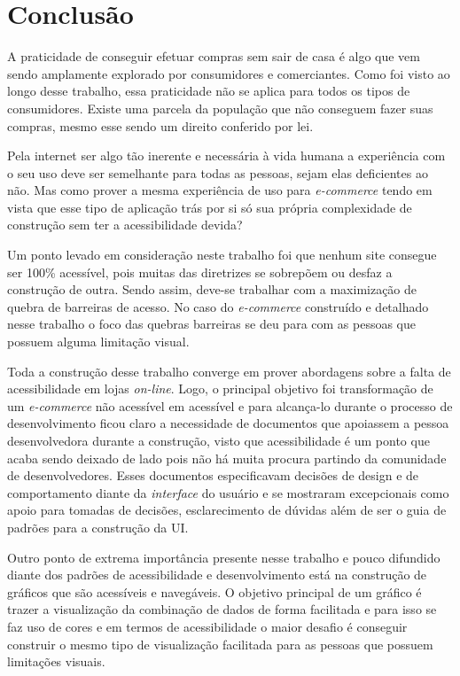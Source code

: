 \section{Conclusão}
\label{sec:conclusao}


{

A praticidade de conseguir efetuar compras sem sair de casa é algo que vem sendo amplamente explorado por consumidores e comerciantes. Como foi visto ao longo desse trabalho, essa praticidade não se aplica para todos os tipos de consumidores. Existe uma parcela da população que não conseguem fazer suas compras, mesmo esse sendo um direito conferido por lei.

Pela internet ser algo tão inerente e necessária à vida humana a experiência com o seu uso deve ser semelhante para todas as pessoas, sejam elas deficientes ao não. Mas como prover a mesma experiência de uso para \textit{e-commerce} tendo em vista que esse tipo de aplicação trás por si só sua própria complexidade de construção sem ter a acessibilidade devida? 

Um ponto levado em consideração neste trabalho foi que nenhum site consegue ser 100\% acessível, pois muitas das diretrizes se sobrepõem ou desfaz a construção de outra. Sendo assim, deve-se trabalhar com a maximização de quebra de barreiras de acesso. No caso do \textit{e-commerce} construído e detalhado nesse trabalho o foco das quebras barreiras se deu para com as pessoas que possuem alguma limitação visual. 

Toda a construção desse trabalho converge em prover abordagens sobre a falta de acessibilidade em lojas \textit{on-line}. Logo, o principal objetivo foi transformação de um \textit{e-commerce} não acessível em acessível e para alcança-lo durante o processo de desenvolvimento ficou claro a necessidade de documentos que apoiassem a pessoa desenvolvedora durante a construção, visto que acessibilidade é um ponto que acaba sendo deixado de lado pois não há muita procura partindo da comunidade de desenvolvedores. Esses documentos especificavam decisões de design e de comportamento diante da \textit{interface} do usuário e se mostraram excepcionais como apoio para tomadas de decisões, esclarecimento de dúvidas além de ser o guia de padrões para a construção da UI.

Outro ponto de extrema importância presente nesse trabalho e pouco difundido diante dos padrões de acessibilidade e desenvolvimento está na construção de gráficos que são acessíveis e navegáveis. O objetivo principal de um gráfico é trazer a visualização da combinação de dados de forma facilitada e para isso se faz uso de cores e em termos de acessibilidade o maior desafio é conseguir construir o mesmo tipo de visualização facilitada para as pessoas que possuem limitações visuais. 

}
